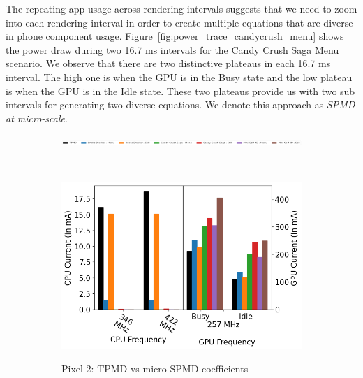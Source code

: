 The repeating app usage across rendering intervals suggests that we
need to zoom into each rendering interval in order to create
multiple equations that are diverse in phone component usage.
Figure~\ref{fig:power_trace_candycrush_menu} shows the power draw
during two 16.7 ms intervals for the Candy Crush Saga Menu scenario.
We observe that there are two distinctive plateaus in each 
16.7 ms interval. The high one is when the GPU is in the Busy state
and the low plateau is when the GPU is in the Idle state.  These two
plateaus provide us with two sub intervals for generating two diverse
equations.  We denote this approach as {\it SPMD at micro-scale}.
\begin{figure}[tp]
     \centering
     \begin{subfigure}[b]{\textwidth}
         \centering
         \includegraphics[width=\textwidth]{figures/label_macro_equations.png}
    \end{subfigure}
    \\
    \hfill
    \centering
     \begin{subfigure}[b]{0.31\textwidth}
         \centering
         \includegraphics[width=\textwidth]{figures/002_Pixel2_16_micro_equations.png}
         \label{fig:micro_equations_p2}
         \vspace{-0.25in}
         \caption{Pixel 2: TPMD vs micro-SPMD coefficients}
     \end{subfigure}
    \begin{subfigure}[b]{0.32\textwidth}
         \centering

\end{subfigure}
\end{figure}
